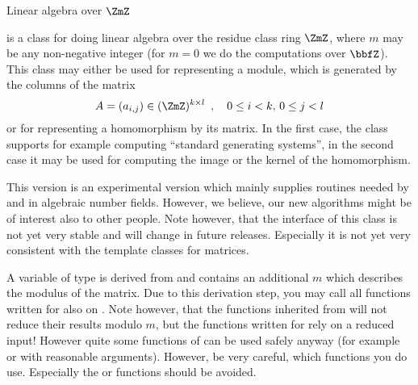 

\NAME

 \dotfill Linear algebra over $\ZmZ$



\ABSTRACT

 is a class for doing linear algebra over the residue class ring $\ZmZ$,
where $m$ may be any non-negative integer (for $m = 0$ we do the computations over $\bbfZ$).
This class may either be used for representing a module, which is generated by the columns of the
matrix
\begin{displaymath}
  A = (a_{i,j}) \in (\ZmZ)^{k \times l} \enspace,\quad 0\leq i < k,\, 0 \leq j < l
\end{displaymath}
or for representing a homomorphism by its matrix.  In the first case, the class supports for
example computing ``standard generating systems'', in the second case it may be used for
computing the image or the kernel of the homomorphism.

This version is an experimental version which mainly supplies routines needed by 
and  in algebraic number fields.  However, we believe, our new algorithms might be
of interest also to other people.  Note however, that the interface of this class is not yet
very stable and will change in future releases.  Especially it is not yet very consistent with
the template classes for matrices.



\DESCRIPTION

A variable of type  is derived from  and contains an
additional  $m$ which describes the modulus of the matrix.  Due to this derivation
step, you may call all functions written for  also on
.  Note however, that the functions inherited from 
will not reduce their results modulo $m$, but the functions written for 
rely on a reduced input! However quite some functions of  can be used safely
anyway (for example  or  with reasonable arguments).  However, be
very careful, which functions you do use.  Especially the  or
 functions should be avoided.

